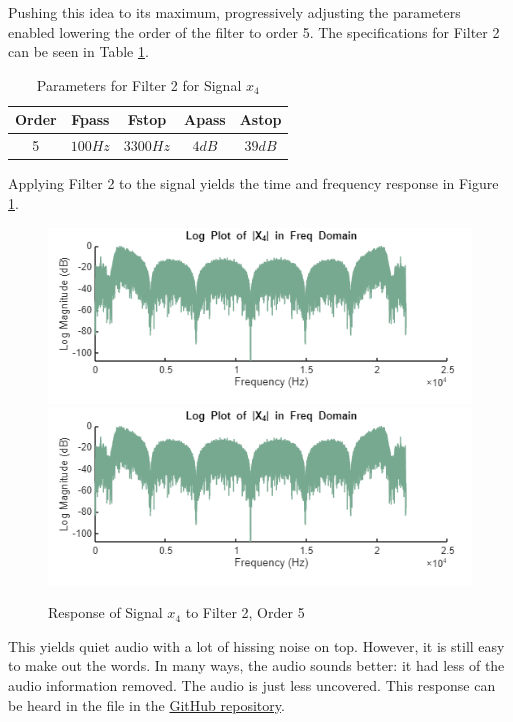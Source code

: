 Pushing this idea to its maximum, progressively adjusting the parameters enabled lowering the order of the filter to order 5.  The specifications for Filter 2 can be seen in Table \ref{tab:x4_v21}. 

\begin{table}[H]
    \centering
    \begin{tabular}{c|cccc}
         Order & Fpass & Fstop & Apass & Astop \\ \hline
         5 & $100  \unit{Hz}$ & $3300  \unit{Hz}$ & $4  \unit{dB} $ & $39  \unit{dB}$
    \end{tabular}
    \caption{Parameters for Filter 2 for Signal $x_4$}
    \label{tab:x4_v21}
\end{table}

Applying Filter 2 to the signal yields the time and frequency response in Figure \ref{fig:x4_v21_both}.

\begin{figure}[H]
    \centering
    \includegraphics[width=0.5\linewidth]{figures/x4_v21.png}
    \includegraphics[width=0.5\linewidth]{figures/X4_v21.png}
    \caption{Response of Signal $x_4$ to Filter 2, Order 5}
    \label{fig:x4_v21_both}
\end{figure}

This yields quiet audio with a lot of hissing noise on top.  However, it is still easy to make out the words.  In many ways, the audio sounds better: it had less of the audio information removed.  The audio is just less uncovered.  This response can be heard in the  file in the \href{https://github.com/dbcometto/ece434_cpx2}{GitHub repository}.


